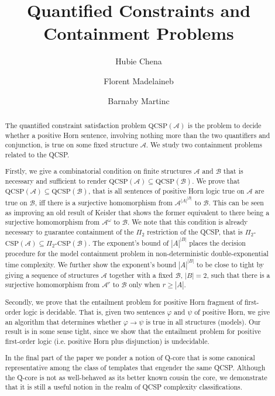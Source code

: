 \documentclass{LMCS}
\title[Quantified Constraints and Containment Problems]
        {Quantified Constraints and Containment Problems\rsuper*}
\author[H.~Chen]{Hubie Chen\rsuper a}
\author[F.~Madelaine]{Florent Madelaine\rsuper b}
\author[B.~Martin]{Barnaby Martin\rsuper c}
\begin{document}
\maketitle

\begin{abstract}
The quantified constraint satisfaction problem $\mathrm{QCSP}(\mathcal{A})$ is the problem to decide whether a positive Horn sentence, involving nothing more than the two quantifiers and conjunction, is true on some fixed structure $\mathcal{A}$. We study two containment problems related to the QCSP.

Firstly, we give a combinatorial condition on finite structures $\mathcal{A}$ and $\mathcal{B}$ that is necessary and sufficient to render $\mathrm{QCSP}(\mathcal{A}) \subseteq \mathrm{QCSP}(\mathcal{B})$.  We prove that $\mathrm{QCSP}(\mathcal{A}) \subseteq \mathrm{QCSP}(\mathcal{B})$, that is all sentences of positive Horn logic true on $\mathcal{A}$ are true on $\mathcal{B}$, iff there is a surjective homomorphism from $\mathcal{A}^{|A|^{|B|}}$ to $\mathcal{B}$. This can be seen as improving an old result of Keisler that shows the former equivalent to there being a surjective homomorphism from $\mathcal{A}^\omega$ to $\mathcal{B}$.  We note that this condition is already necessary to guarantee containment of the $\Pi_2$ restriction of the QCSP, that is $\Pi_2$-$\mathrm{CSP}(\mathcal{A}) \subseteq \Pi_2$-$\mathrm{CSP}(\mathcal{B})$. 
The exponent's bound of ${|A|^{|B|}}$ places the decision procedure for the model containment problem in non-deterministic double-exponential time complexity. We further show the exponent's bound $|A|^{|B|}$ to be close to tight by giving a sequence of structures $\mathcal{A}$ together with a fixed $\mathcal{B}$, $|B|=2$, such that there is a surjective homomorphism from $\mathcal{A}^r$ to $\mathcal{B}$ only when $r \geq |A|$.

Secondly, we prove that the entailment problem for positive Horn fragment of first-order logic is decidable. That is, given two sentences $\varphi$ and $\psi$ of positive Horn,  we give an algorithm that determines whether $\varphi \rightarrow \psi$ is true in all structures (models). Our result is in some sense tight, since we show that the entailment problem for positive first-order logic (\mbox{i.e.} positive Horn plus disjunction) is undecidable.

In the final part of the paper we ponder a notion of Q-core that is some canonical representative among the class of templates that engender the same QCSP. Although the Q-core is not as well-behaved as its better known cousin the core, we demonstrate that it is still a useful notion in the realm of QCSP complexity classifications.
\end{abstract}
\end{document}
